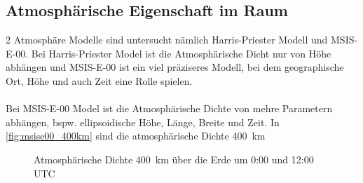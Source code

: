 \documentclass{article}
\begin{document}
\subsection{Atmosphärische Eigenschaft im Raum}
2 Atmosphäre Modelle sind untersucht nämlich Harris-Priester Modell \cite{harris1963relation} und MSIS-E-00\cite{picone2002nrlmsise}. Bei Harris-Priester Model ist die Atmosphärische Dicht nur von Höhe abhängen und MSIS-E-00 ist ein viel präziseres Modell, bei dem geographische Ort, Höhe und auch Zeit eine Rolle spielen.
\\\\
Bei MSIS-E-00 Model ist die Atmosphärische Dichte von mehre Parametern abhängen, bspw.  ellipsoidische Höhe, Länge, Breite und Zeit. In \autoref{fig:msise00_400km} sind die atmosphärische Dichte \SI{400}{\kilo \meter}
\begin{figure}[ht]\centering 
	\caption{Atmosphärische Dichte \SI{400}{\kilo \meter} über die Erde um 0:00 und 12:00 UTC}
	\label{fig:msise00_400km}
\end{figure}
\end{document}
